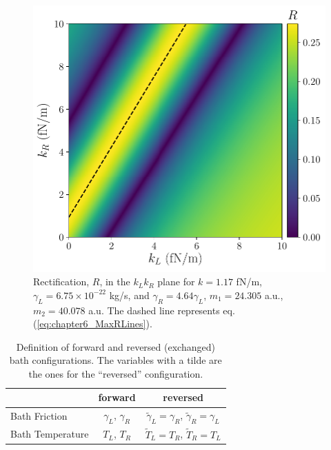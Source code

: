 \begin{figure}
  \center
  \includegraphics[width=0.85\linewidth]{Figures/RwMPlota.pdf}
  \caption{Rectification, $R$, in the $k_L k_R$ plane for $k = 1.17$ fN/m, $\gamma_L = 6.75\times 10^{-22}$ kg/s, and $\gamma_R = 4.64\gamma_L$, $m_1 = 24.305$ a.u., $m_2 = 40.078$ a.u. The dashed  line represents eq.  (\ref{eq:chapter6_MaxRLines}).}
  \label{fig:Fig_rectification_K_plane}
\end{figure}

\begin{table}[]
\center
\caption{Definition of forward and reversed (exchanged) bath configurations. The variables with a tilde are the ones for the ``reversed'' configuration.}
\begin{tabular}{lcc}
\hline
& forward                & reversed                                                       \\ \hline
Bath Friction    & $\gamma_L$, $\gamma_R$ & $\tilde{\gamma}_L =\gamma_R $,  $\tilde{\gamma}_R =\gamma_L $   \\
Bath Temperature & $T_L$, $T_R$           & $\tilde{T}_L =T_R $,  $\tilde{T}_R =T_L $                     \\
\hline
\end{tabular}
\label{tab:reversed_bath}
\end{table}
%
%

